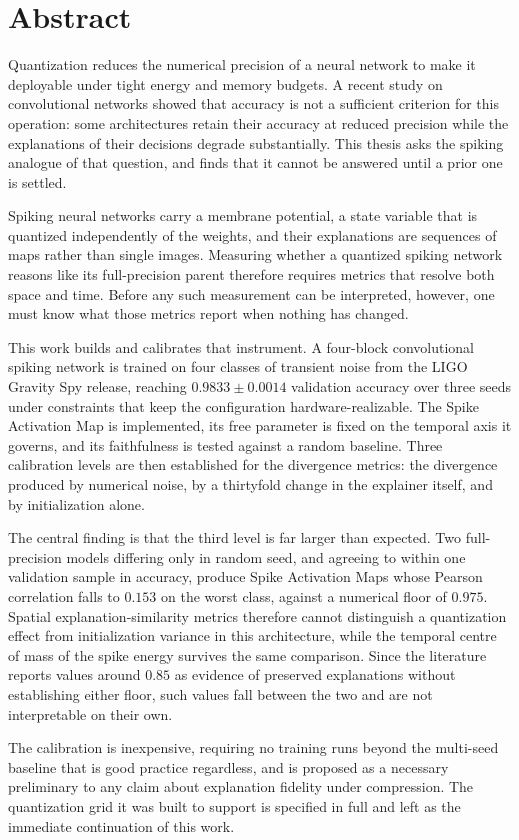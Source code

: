 \chapter*{Abstract}

Quantization reduces the numerical precision of a neural network to make it
deployable under tight energy and memory budgets. A recent study on
convolutional networks showed that accuracy is not a sufficient criterion for
this operation: some architectures retain their accuracy at reduced precision
while the explanations of their decisions degrade substantially. This thesis
asks the spiking analogue of that question, and finds that it cannot be
answered until a prior one is settled.

Spiking neural networks carry a membrane potential, a state variable that is
quantized independently of the weights, and their explanations are sequences of
maps rather than single images. Measuring whether a quantized spiking network
reasons like its full-precision parent therefore requires metrics that resolve
both space and time. Before any such measurement can be interpreted, however,
one must know what those metrics report when nothing has changed.

This work builds and calibrates that instrument. A four-block convolutional
spiking network is trained on four classes of transient noise from the LIGO
Gravity Spy release, reaching $0.9833 \pm 0.0014$ validation accuracy over three
seeds under constraints that keep the configuration hardware-realizable. The
Spike Activation Map is implemented, its free parameter is fixed on the temporal
axis it governs, and its faithfulness is tested against a random baseline. Three
calibration levels are then established for the divergence metrics: the
divergence produced by numerical noise, by a thirtyfold change in the explainer
itself, and by initialization alone.

The central finding is that the third level is far larger than expected. Two
full-precision models differing only in random seed, and agreeing to within one
validation sample in accuracy, produce Spike Activation Maps whose Pearson
correlation falls to $0.153$ on the worst class, against a numerical floor of
$0.975$. Spatial explanation-similarity metrics therefore cannot distinguish a
quantization effect from initialization variance in this architecture, while the
temporal centre of mass of the spike energy survives the same comparison. Since
the literature reports values around $0.85$ as evidence of preserved
explanations without establishing either floor, such values fall between the two
and are not interpretable on their own.

The calibration is inexpensive, requiring no training runs beyond the multi-seed
baseline that is good practice regardless, and is proposed as a necessary
preliminary to any claim about explanation fidelity under compression. The
quantization grid it was built to support is specified in full and left as the
immediate continuation of this work.

